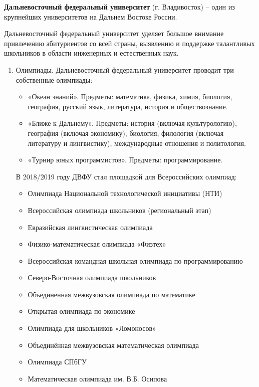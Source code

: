 \textbf{Дальневосточный федеральный университет} (г. Владивосток) – один из крупнейших университетов на Дальнем Востоке России.

Дальневосточный федеральный университет уделяет большое внимание привлечению абитуриентов со всей страны, выявлению и поддержке талантливых школьников в области инженерных и естественных наук.
\begin{enumerate}
    \item Олимпиады. Дальневосточный федеральный университет проводит три собственные олимпиады:
    \begin{itemize}
        \item «Океан знаний». Предметы: математика, физика, химия, биология, география, русский язык, литература, история и обществознание.
        \item «Ближе к Дальнему». Предметы: история (включая культурологию), география (включая экономику), биология, филология (включая литературу и лингвистику), международные отношения и политология.
        \item «Турнир юных программистов». Предметы: программирование.
    \end{itemize}

    В 2018/2019 году ДВФУ стал площадкой для Всероссийских олимпиад:
    \begin{itemize}
        \item Олимпиада Национальной технологической инициативы (НТИ)
        \item Всероссийская олимпиада школьников (региональный этап)
        \item Евразийская лингвистическая олимпиада
        \item Физико-математическая олимпиада «Физтех»
        \item Всероссийская командная школьная олимпиада по программированию
        \item Северо-Восточная олимпиада школьников
        \item Объединенная межвузовская олимпиада по математике
        \item Открытая олимпиада по экономике
        \item Олимпиада для школьников «Ломоносов»
        \item Объединённая межвузовская математическая олимпиада
        \item Олимпиада СПбГУ
        \item Математическая олимпиада им. В.Б. Осипова 
    \end{itemize}


\end{enumerate}
